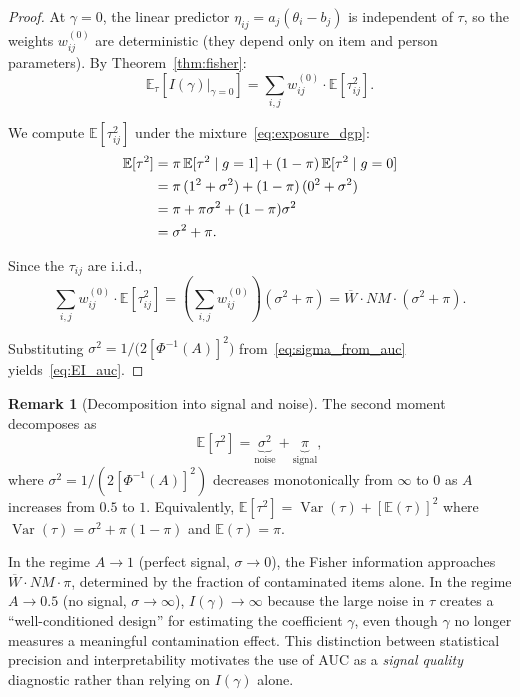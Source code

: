 \documentclass[11pt,a4paper]{article}
\theoremstyle{definition}
\newtheorem{remark}[theorem]{Remark}
\DeclareMathOperator{\Var}{Var}
\begin{document}
\begin{proof}
At $\gamma=0$, the linear predictor $\eta_{ij}=a_j(\theta_i-b_j)$ is
independent of $\tau$, so the weights $w_{ij}^{(0)}$ are deterministic
(they depend only on item and person parameters).
By Theorem~\ref{thm:fisher}:
\begin{equation}\label{eq:EI_step1}
  \mathbb{E}_\tau\!\left[I(\gamma)\big|_{\gamma=0}\right]
  = \sum_{i,j}w_{ij}^{(0)}\cdot\mathbb{E}[\tau_{ij}^2].
\end{equation}

We compute $\mathbb{E}[\tau_{ij}^2]$ under the mixture~\eqref{eq:exposure_dgp}:
\begin{align}
  \mathbb{E}[\tau^2]
  &= \pi\,\mathbb{E}[\tau^2\mid g=1] + (1-\pi)\,\mathbb{E}[\tau^2\mid g=0]
  \notag\\
  &= \pi\,(1^2+\sigma^2) + (1-\pi)\,(0^2+\sigma^2)
  \notag\\
  &= \pi + \pi\sigma^2 + (1-\pi)\sigma^2
  \notag\\
  &= \sigma^2 + \pi.
  \label{eq:Etau2}
\end{align}

Since the $\tau_{ij}$ are i.i.d.,
\begin{equation}
  \sum_{i,j}w_{ij}^{(0)}\cdot\mathbb{E}[\tau_{ij}^2]
  = \left(\sum_{i,j}w_{ij}^{(0)}\right)(\sigma^2+\pi)
  = \overline{W}\cdot NM\cdot(\sigma^2+\pi).
\end{equation}

Substituting $\sigma^2 = 1/\bigl(2[\Phi^{-1}(A)]^2\bigr)$
from~\eqref{eq:sigma_from_auc} yields~\eqref{eq:EI_auc}.
\end{proof}


\begin{remark}[Decomposition into signal and noise]\label{rem:decomp}
The second moment decomposes as
\[
  \mathbb{E}[\tau^2]
  = \underbrace{\sigma^2}_{\text{noise}}
  + \underbrace{\pi}_{\text{signal}}\!,
\]
where $\sigma^2 = 1/(2[\Phi^{-1}(A)]^2)$ decreases monotonically
from $\infty$ to $0$ as $A$ increases from $0.5$ to $1$.
Equivalently,
$\mathbb{E}[\tau^2] = \Var(\tau) + [\mathbb{E}(\tau)]^2$
where $\Var(\tau)=\sigma^2+\pi(1{-}\pi)$ and $\mathbb{E}(\tau)=\pi$.

In the regime $A\to 1$ (perfect signal, $\sigma\to 0$),
the Fisher information approaches $\overline{W}\cdot NM\cdot\pi$,
determined by the fraction of contaminated items alone.
In the regime $A\to 0.5$ (no signal, $\sigma\to\infty$),
$I(\gamma)\to\infty$ because the large noise in $\tau$ creates a
``well-conditioned design'' for estimating the coefficient $\gamma$,
even though $\gamma$ no longer measures a meaningful contamination effect.
This distinction between statistical precision and interpretability
motivates the use of AUC as a \emph{signal quality} diagnostic
rather than relying on $I(\gamma)$ alone.
\end{remark}
\end{document}
